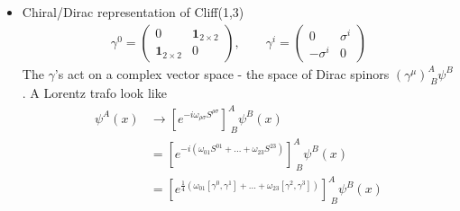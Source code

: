 \documentclass[../main.tex]{subfiles}
\begin{document}
\begin{itemize}
\item Chiral/Dirac representation of Cliff(1,3)
\begin{align}
\gamma^0=\left(\begin{matrix}
0 & \mathbf{1}_{2\times2}\\
\mathbf{1}_{2\times2} & 0
\end{matrix}\right),\qquad
\gamma^i=\left(\begin{matrix}
0 & \sigma^i\\
-\sigma^i & 0
\end{matrix}\right)
\end{align}
The $\gamma$'s act on a complex vector space - the space of Dirac spinors $(\gamma^\mu)^A_{\;B}\psi^B$. A Lorentz trafo look like
\begin{align}
\psi^A(x)&\rightarrow\left[e^{-i\omega_{\rho\sigma}S^{\rho\sigma}}\right]^A_{\;B}\psi^B(x)\\
&=\left[e^{-i(\omega_{01}S^{01}+...+\omega_{23}S^{23})}\right]^A_{\;B}\psi^B(x)\\
&=\left[e^{\frac{1}{4}(\omega_{01}[\gamma^0,\gamma^1]+...+\omega_{23}[\gamma^2,\gamma^3])}\right]^A_{\;B}\psi^B(x)
\end{align}

\end{itemize}
\end{document}
